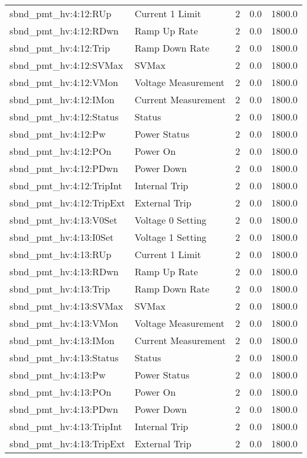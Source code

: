 \begin{center}
\begin{longtable}{l | l l l l }
sbnd\_pmt\_hv:4:12:RUp & Current 1 Limit & 2 & 0.0 & 1800.0\\ 
sbnd\_pmt\_hv:4:12:RDwn & Ramp Up Rate & 2 & 0.0 & 1800.0\\ 
sbnd\_pmt\_hv:4:12:Trip & Ramp Down Rate & 2 & 0.0 & 1800.0\\ 
sbnd\_pmt\_hv:4:12:SVMax & SVMax & 2 & 0.0 & 1800.0\\ 
sbnd\_pmt\_hv:4:12:VMon & Voltage Measurement & 2 & 0.0 & 1800.0\\ 
sbnd\_pmt\_hv:4:12:IMon & Current Measurement & 2 & 0.0 & 1800.0\\ 
sbnd\_pmt\_hv:4:12:Status & Status & 2 & 0.0 & 1800.0\\ 
sbnd\_pmt\_hv:4:12:Pw & Power Status & 2 & 0.0 & 1800.0\\ 
sbnd\_pmt\_hv:4:12:POn & Power On & 2 & 0.0 & 1800.0\\ 
sbnd\_pmt\_hv:4:12:PDwn & Power Down & 2 & 0.0 & 1800.0\\ 
sbnd\_pmt\_hv:4:12:TripInt & Internal Trip & 2 & 0.0 & 1800.0\\ 
sbnd\_pmt\_hv:4:12:TripExt & External Trip & 2 & 0.0 & 1800.0\\ 
sbnd\_pmt\_hv:4:13:V0Set & Voltage 0 Setting & 2 & 0.0 & 1800.0\\ 
sbnd\_pmt\_hv:4:13:I0Set & Voltage 1 Setting & 2 & 0.0 & 1800.0\\ 
sbnd\_pmt\_hv:4:13:RUp & Current 1 Limit & 2 & 0.0 & 1800.0\\ 
sbnd\_pmt\_hv:4:13:RDwn & Ramp Up Rate & 2 & 0.0 & 1800.0\\ 
sbnd\_pmt\_hv:4:13:Trip & Ramp Down Rate & 2 & 0.0 & 1800.0\\ 
sbnd\_pmt\_hv:4:13:SVMax & SVMax & 2 & 0.0 & 1800.0\\ 
sbnd\_pmt\_hv:4:13:VMon & Voltage Measurement & 2 & 0.0 & 1800.0\\ 
sbnd\_pmt\_hv:4:13:IMon & Current Measurement & 2 & 0.0 & 1800.0\\ 
sbnd\_pmt\_hv:4:13:Status & Status & 2 & 0.0 & 1800.0\\ 
sbnd\_pmt\_hv:4:13:Pw & Power Status & 2 & 0.0 & 1800.0\\ 
sbnd\_pmt\_hv:4:13:POn & Power On & 2 & 0.0 & 1800.0\\ 
sbnd\_pmt\_hv:4:13:PDwn & Power Down & 2 & 0.0 & 1800.0\\ 
sbnd\_pmt\_hv:4:13:TripInt & Internal Trip & 2 & 0.0 & 1800.0\\ 
sbnd\_pmt\_hv:4:13:TripExt & External Trip & 2 & 0.0 & 1800.0\\ 

\end{longtable}
\end{center}
